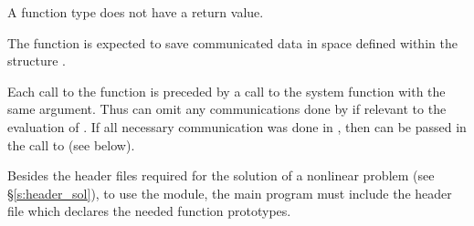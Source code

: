 {
  A  function type does not have a return value.
}
{
  The  function is expected to save communicated data in space defined
  within the structure . 

  Each call to the  function is preceded by a call to the system function
   with the same  argument.  Thus  can omit 
  any communications done by  if relevant to the evaluation of .
  If all necessary communication was done in , then 
  can be passed in the call to  (see below).
}

Besides the header files required for the solution of a nonlinear problem
(see \S\ref{s:header_sol}),  to use the {\kinbbdpre} module, the main program 
must include the header file  which declares the needed
function prototypes.

